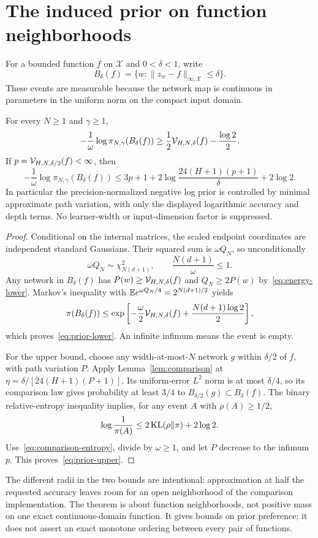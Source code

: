 \section{The induced prior on function neighborhoods}
For a bounded function $f$ on $\mathcal X$ and $0<\delta<1$, write
\[
 B_\delta(f)=\{w:\|z_w-f\|_{\infty,\mathcal X}\le\delta\}.
\]
These events are measurable because the network map is continuous in parameters in the uniform norm on the compact input domain.

\begin{theorem}
\label{thm:prior}
For every $N\ge1$ and $\gamma\ge1$,
\begin{equation}
 -\frac1\omega\log\pi_{N,\gamma}(B_\delta(f))
 \ge\frac12\mathcal V_{H,N,\delta}(f)-\frac{\log2}{2}.
 \label{eq:prior-lower}
\end{equation}
If $p=\mathcal V_{H,N,\delta/2}(f)<\infty$, then
\begin{equation}
 -\frac1\omega\log\pi_{N,\gamma}(B_\delta(f))
 \le3p+1+2\log\frac{24(H+1)(p+1)}\delta+2\log2.
 \label{eq:prior-upper}
\end{equation}
In particular the precision-normalized negative log prior is controlled by minimal approximate path variation, with only the displayed logarithmic accuracy and depth terms. No learner-width or input-dimension factor is suppressed.
\end{theorem}
\begin{proof}
Conditional on the internal matrices, the scaled endpoint coordinates are independent standard Gaussians. Their squared sum is $\omega Q_N$, so unconditionally
\begin{equation}
 \omega Q_N\sim\chi^2_{N(d+1)},\qquad
 \frac{N(d+1)}\omega\le1.
 \label{eq:chi-square}
\end{equation}
Any network in $B_\delta(f)$ has $P(w)\ge\mathcal V_{H,N,\delta}(f)$ and $Q_N\ge2P(w)$ by~\eqref{eq:energy-lower}. Markov's inequality with
$\mathbb E e^{\omega Q_N/4}=2^{N(d+1)/2}$ yields
\[
 \pi(B_\delta(f))\le
 \exp\left[-\frac\omega2\mathcal V_{H,N,\delta}(f)
                      +\frac{N(d+1)\log2}{2}\right],
\]
which proves~\eqref{eq:prior-lower}. An infinite infimum means the event is empty.

For the upper bound, choose any width-at-most-$N$ network $g$ within $\delta/2$ of $f$, with path variation $P$. Apply Lemma~\ref{lem:comparison} at
$\eta=\delta/[24(H+1)(P+1)]$. Its uniform-error $L^2$ norm is at most $\delta/4$, so its comparison law gives probability at least $3/4$ to $B_{\delta/2}(g)\subset B_\delta(f)$. The binary relative-entropy inequality implies, for any event $A$ with $\rho(A)\ge1/2$,
\[
 \log\frac1{\pi(A)}\le2\operatorname{KL}(\rho\|\pi)+2\log2.
\]
Use~\eqref{eq:comparison-entropy}, divide by $\omega\ge1$, and let $P$ decrease to the infimum $p$. This proves~\eqref{eq:prior-upper}.
\end{proof}

The different radii in the two bounds are intentional: approximation at half the requested accuracy leaves room for an open neighborhood of the comparison implementation. The theorem is about function neighborhoods, not positive mass on one exact continuous-domain function. It gives bounds on prior preference; it does not assert an exact monotone ordering between every pair of functions.
